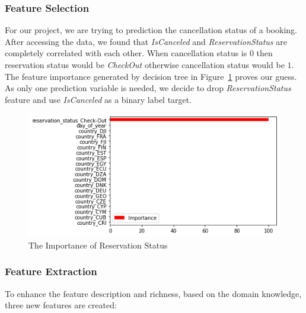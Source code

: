 \documentclass[10pt,twocolumn,letterpaper]{article}
\begin{document}


\subsubsection{Feature Selection}
For our project, we are trying to prediction the cancellation status of a booking. After accessing the data, we found that \emph{IsCanceled} and \emph{ReservationStatus} are completely correlated with each other. When cancellation status is $0$ then reservation status would be \emph{CheckOut} otherwise cancellation status would be $1$. The feature importance generated by decision tree in Figure~\ref{fig:ResverationStatus} proves our guess. As only one prediction variable is needed, we decide to drop \emph{ReservationStatus} feature and use \emph{IsCanceled} as a binary label target. 

\begin{figure}[ht]
\begin{center}
    \includegraphics[width=0.8\linewidth]{images/Reservation_Status_Feature.png}
\end{center}
   \caption{The Importance of Reservation Status}
\label{fig:ResverationStatus}
\end{figure}


\subsubsection{Feature Extraction}
To enhance the feature description and richness, based on the domain knowledge, three new features are created: 
\end{document}
